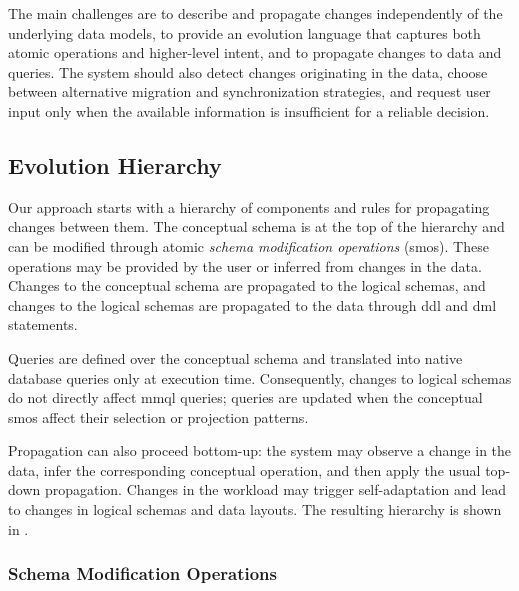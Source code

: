 The main challenges are to describe and propagate changes independently of the underlying data models, to provide an evolution language that captures both atomic operations and higher-level intent, and to propagate changes to data and queries. The system should also detect changes originating in the data, choose between alternative migration and synchronization strategies, and request user input only when the available information is insufficient for a reliable decision.

\subsection{Evolution Hierarchy}

Our approach starts with a hierarchy of components and rules for propagating changes between them. The conceptual schema is at the top of the hierarchy and can be modified through atomic \emph{schema modification operations} (\acrshort{smo}s). These operations may be provided by the user or inferred from changes in the data. Changes to the conceptual schema are propagated to the logical schemas, and changes to the logical schemas are propagated to the data through \acrshort{ddl} and \acrshort{dml} statements.

Queries are defined over the conceptual schema and translated into native database queries only at execution time. Consequently, changes to logical schemas do not directly affect \acrshort{mmql} queries; queries are updated when the conceptual \acrshort{smo}s affect their selection or projection patterns.

Propagation can also proceed bottom-up: the system may observe a change in the data, infer the corresponding conceptual operation, and then apply the usual top-down propagation. Changes in the workload may trigger self-adaptation and lead to changes in logical schemas and data layouts. The resulting hierarchy is shown in .

\subsubsection{Schema Modification Operations}

